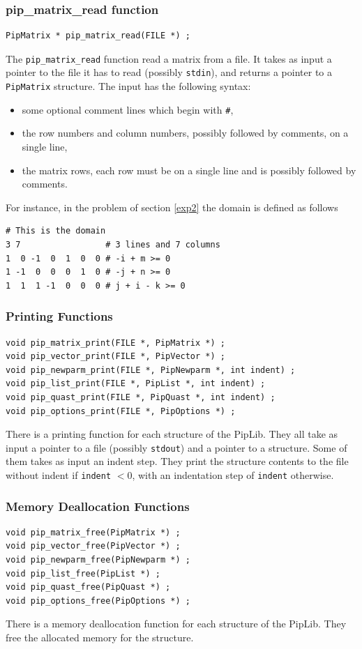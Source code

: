 \documentclass[12pt,a4paper]{article}
\begin{document}
\subsubsection{pip\_matrix\_read function}
\begin{verbatim}
PipMatrix * pip_matrix_read(FILE *) ;
\end{verbatim}
The {\tt pip\_matrix\_read} function read a matrix from a file. It takes
as input a pointer to the file it has to read (possibly {\tt stdin}), and
returns a pointer to a {\tt PipMatrix} structure. The input has the following syntax:
\begin{itemize}
\item some optional comment lines which begin with {\tt \#},
\item the row numbers and column numbers, possibly followed by comments,
      on a single line,
\item the matrix rows, each row must be on a single line and is possibly
      followed by comments.
\end{itemize}
For instance, in the problem of section \ref{exp2} the domain is defined as follows
\begin{verbatim}
# This is the domain
3 7                 # 3 lines and 7 columns
1  0 -1  0  1  0  0 # -i + m >= 0
1 -1  0  0  0  1  0 # -j + n >= 0
1  1  1 -1  0  0  0 # j + i - k >= 0
\end{verbatim}

\subsubsection{Printing Functions}
\begin{verbatim}
void pip_matrix_print(FILE *, PipMatrix *) ;
void pip_vector_print(FILE *, PipVector *) ;
void pip_newparm_print(FILE *, PipNewparm *, int indent) ;
void pip_list_print(FILE *, PipList *, int indent) ;
void pip_quast_print(FILE *, PipQuast *, int indent) ;
void pip_options_print(FILE *, PipOptions *) ;
\end{verbatim}
There is a printing function for each structure of the PipLib. They all take as input
a pointer to a file (possibly {\tt stdout}) and a pointer to a structure.
Some of them takes as input an
indent step. They print the structure contents to the file without indent if
{\tt indent} $< 0$, with an indentation step of {\tt indent} otherwise.

\subsubsection{Memory Deallocation Functions}
\begin{verbatim}
void pip_matrix_free(PipMatrix *) ;
void pip_vector_free(PipVector *) ;
void pip_newparm_free(PipNewparm *) ;
void pip_list_free(PipList *) ;
void pip_quast_free(PipQuast *) ;
void pip_options_free(PipOptions *) ;
\end{verbatim}
There is a memory deallocation function for each structure of the PipLib.
They free the allocated memory for the structure.
\end{document}
